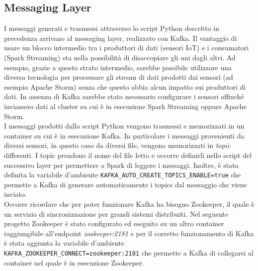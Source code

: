 \documentclass{article}
\begin{document}
\subsection{Messaging Layer}
I messaggi generati e trasmessi attraverso lo script Python descritto in precedenza arrivano al messaging layer, realizzato con Kafka. Il vantaggio di usare un blocco intermedio tra i produttori di dati (sensori IoT) e i consumatori (Spark Streaming) sta nella possibilità di disaccopiare gli uni dagli altri. Ad esempio, grazie a questo strato intermedio, sarebbe possibile utilizzare una diversa tecnologia per processare gli stream di dati prodotti dai sensori (ad esempio Apache Storm) senza che questo abbia alcun impatto sui produttori di dati. In assenza di Kafka sarebbe stato necessario configurare i sensori affinché inviassero dati al cluster su cui è in esecuzione Spark Streaming oppure Apache Storm.\\
I messaggi prodotti dallo script Python vengono trasmessi e memorizzati in un container su cui è in esecuzione Kafka.
In particolare i messaggi provenienti da diversi sensori, in questo caso da diversi file, vengono memorizzati in \textit{topic} differenti. I topic prendono il nome del file letto e occorre definirli nello script del successivo layer per permettere a Spark di leggere i messaggi. Inoltre, è stata definita la variabile d'ambiente \texttt{KAFKA\_AUTO\_CREATE\_TOPICS\_ENABLE=true} che permette a Kafka di generare automaticamente i topics dal messaggio che viene inviato.\\ 
Occorre ricordare che per poter funzionare Kafka ha bisogno Zookeeper, il quale è un servizio di sincronizzazione per grandi sistemi distribuiti. Nel seguente progetto Zookeeper è stato configurato ed eseguito su un altro container raggiungibile all'endpoint \textit{zookeeper:2181} e per il corretto funzionamento di Kafka è stata aggiunta la variabile d'ambiente \texttt{KAFKA\_ZOOKEEPER\_CONNECT=zookeeper:2181} che permette a Kafka di collegarsi al container nel quale è in esecuzione Zookeeper.
\end{document}
